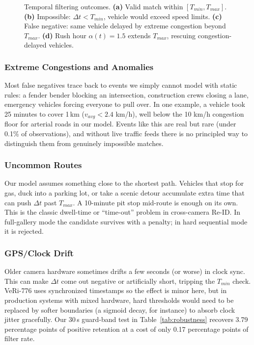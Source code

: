 \documentclass{ijitcs}
\newcommand{\rev}[1]{#1}
\begin{document}
\begin{figure}[htbp]
\caption{Temporal filtering outcomes. \textbf{(a)} Valid match within $[T_{min}, T_{max}]$. \textbf{(b)} Impossible: $\Delta t < T_{min}$, vehicle would exceed speed limits. \textbf{(c)} False negative: same vehicle delayed by extreme congestion beyond $T_{max}$. \textbf{(d)} Rush hour $\alpha(t)=1.5$ extends $T_{max}$, rescuing congestion-delayed vehicles.}
\label{fig:timeline}
\end{figure}

\subsubsection{Extreme Congestions and Anomalies}
Most false negatives trace back to events we simply cannot model with static rules: a fender bender blocking an intersection, construction crews closing a lane, emergency vehicles forcing everyone to pull over. In one example, a vehicle took 25 minutes to cover 1\,km ($v_{avg} < 2.4$ km/h), well below the 10 km/h congestion floor for arterial roads in our model. Events like this are real but rare (under 0.1\% of observations), and without live traffic feeds there is no principled way to distinguish them from genuinely impossible matches.

\subsubsection{Uncommon Routes}
Our model assumes something close to the shortest path. Vehicles that stop for gas, duck into a parking lot, or take a scenic detour accumulate extra time that can push $\Delta t$ past $T_{max}$. A 10-minute pit stop mid-route is enough on its own. \rev{This is the classic dwell-time or ``time-out'' problem in cross-camera Re-ID. In full-gallery mode the candidate survives with a penalty; in hard sequential mode it is rejected.}

\subsubsection{GPS/Clock Drift}
Older camera hardware sometimes drifts a few seconds (or worse) in clock sync. This can make $\Delta t$ come out negative or artificially short, tripping the $T_{min}$ check. VeRi-776 uses synchronized timestamps so the effect is minor here, but in production systems with mixed hardware, hard thresholds would need to be replaced by softer boundaries (a sigmoid decay, for instance) to absorb clock jitter gracefully. \rev{Our 30\,s guard-band test in Table~\ref{tab:robustness} recovers 3.79 percentage points of positive retention at a cost of only 0.17 percentage points of filter rate.}
\end{document}
